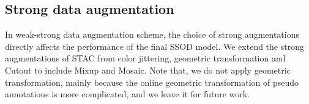 \documentclass[final]{cvpr}
\begin{document}
\begin{table}[t!]
\begin{center}
 \end{center}
 \vspace{-.1in}
 \caption{Comparison of mAP of Instant-Teaching trained with various data augmentation methods at the protocol of 5\% MS-COCO and 8 unlabeled data.  denotes that we also apply strong augmentations ``Color+Cutout'' to unlabeled data in the first step during instant pseudo labeling.}
 \label{tbl:ablation_mm}
\end{table}




\subsection{Strong data augmentation}

In weak-strong data augmentation scheme, the choice of strong augmentations directly affects the performance of the final SSOD model. We extend the strong augmentations of STAC from color jittering, geometric transformation and Cutout to include Mixup and Mosaic. Note that, we do not apply geometric transformation, mainly because the online geometric transformation of pseudo annotations is more complicated, and we leave it for future work.
\end{document}
